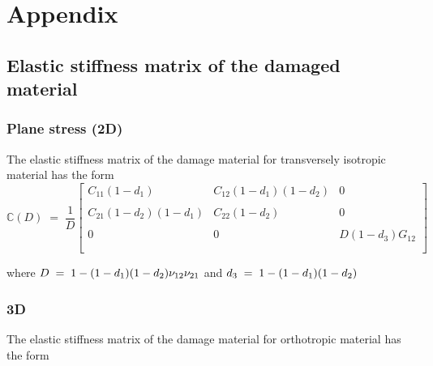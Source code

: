 \documentclass[12pt,twoside]{report}
\newcounter{savepage}
\begin{document}
\newpage
{}
\chapter*{Appendix}
\renewcommand{\thesection}{\Alph{section}.\arabic{section}}
\setcounter{page}{\thesavepage}
\section{Elastic stiffness matrix of the damaged material}
\subsection{Plane stress (2D)}
\indent\indent\indent The elastic stiffness matrix of the damage material for transversely isotropic material has the form \\

\begin{equation*}
\mathbb{C}(D) \; = \; \frac{1}{D}
 \begin{bmatrix}
  C_{11}(1 - d_{1}) & C_{12}(1 - d_{1})(1 - d_{2})  & 0 \\
  \\
  C_{21}(1 - d_{2})(1 - d_{1}) & C_{22}(1 - d_{2}) & 0 \\
 \\  
  0 & 0 &  D(1 - d_{3})G_{12} \\
  \\
 \end{bmatrix}
\end{equation*}

where $\mathlarger{D \; = \; 1 - (1 - d_{1})(1 - d_{2}) \nu_{12}\nu_{21}}$ and $\mathlarger{d_{3} \; = \; 1 - (1 - d_{1})(1 - d_{2}) }$



\subsection{3D}
\indent\indent\indent The elastic stiffness matrix of the damage material for orthotropic material has the form \\
\end{document}
